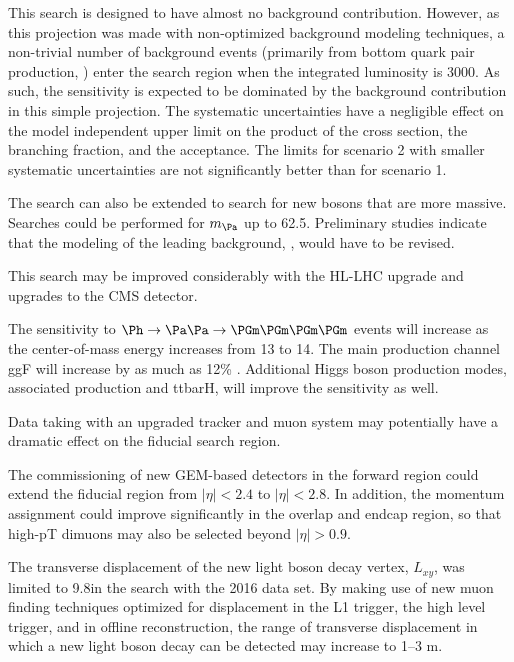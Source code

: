 This search is designed to have almost no background contribution. However, as this projection was made with non-optimized background modeling techniques, a non-trivial number of background events (primarily from bottom quark pair production, \bbbar) enter the search region when the integrated luminosity is 3000\fbinv. As such, the sensitivity is expected to be dominated by the background contribution in this simple projection. The systematic uncertainties have a negligible effect on the model independent upper limit on the product of the cross section, the branching fraction, and the acceptance. The limits for scenario 2 with smaller systematic uncertainties are not significantly better than for scenario 1.


The search can also be extended to search for new bosons that are more massive. Searches could be performed for $\ma$ up to 62.5\UGeV. Preliminary studies indicate that the modeling of the leading background, \bbbar, would have to be revised.

This search may be improved considerably with the HL-LHC upgrade and upgrades to the CMS detector.

The sensitivity to $\Ph\to\Pa\Pa\to\PGm\PGm\PGm\PGm$ events will increase as the center-of-mass energy increases from 13 to 14\UTeV. The main production channel ggF will increase by as much as 12\% \cite{deFlorian:2016spz}. Additional Higgs boson production modes, associated production and ttbarH, will improve the sensitivity as well.

Data taking with an upgraded tracker and muon system may potentially have a dramatic effect on the fiducial search region.

The commissioning of new GEM-based detectors in the forward region could extend the fiducial region from $|\eta| < 2.4$ to $|\eta| < 2.8$. In addition, the momentum assignment could improve significantly in the overlap and endcap region, so that high-pT dimuons may also be selected beyond $|\eta| > 0.9$.

The transverse displacement of the new light boson decay vertex, $L_{xy}$, was limited to 9.8\Ucm in the search with the 2016 data set. By making use of new muon finding techniques optimized for displacement in the L1 trigger, the high level trigger, and in offline reconstruction, the range of transverse displacement in which a new light boson decay can be detected may increase to {1--3 m}.

